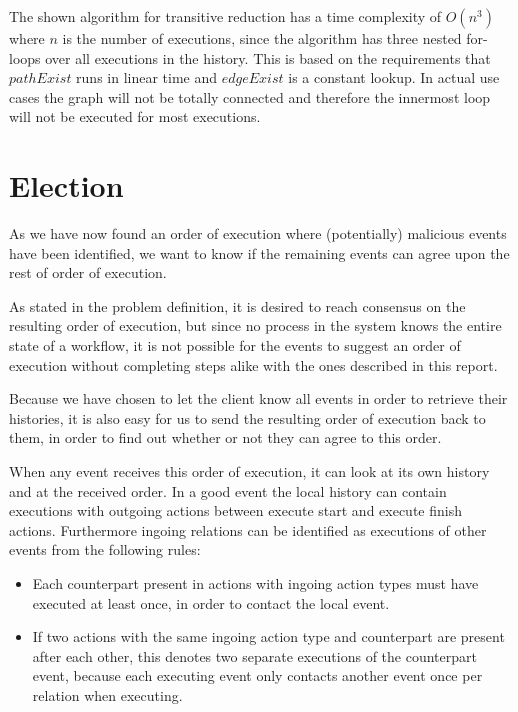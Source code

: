 	\newpar The shown algorithm for transitive reduction has a time complexity of $O(n^3)$ where $n$ is the number of executions, since the algorithm has three nested for-loops over all executions in the history. This is based on the requirements that $pathExist$ runs in linear time and $edgeExist$ is a constant lookup. In actual use cases the graph will not be totally connected and therefore the innermost loop will not be executed for most executions. 



	\section{Election} 
	As we have now found an order of execution where (potentially) malicious events have been identified, we want to know if the remaining events can agree upon the rest of order of execution.
	
	\newpar As stated in the problem definition, it is desired to reach consensus on the resulting order of execution, but since no process in the system knows the entire state of a workflow, it is not possible for the events to suggest an order of execution without completing steps alike with the ones described in this report.
	
	\newpar Because we have chosen to let the client know all events in order to retrieve their histories, it is also easy for us to send the resulting order of execution back to them, in order to find out whether or not they can agree to this order.
	
	\newpar When any event receives this order of execution, it can look at its own history and at the received order. In a good event the local history can contain executions with outgoing actions between execute start and execute finish actions. Furthermore ingoing relations can be identified as executions of other events from the following rules:
	
	\begin{itemize}
		\item Each counterpart present in actions with ingoing action types must have executed at least once, in order to contact the local event.
		\item If two actions with the same ingoing action type and counterpart are present after each other, this denotes two separate executions of the counterpart event, because each executing event only contacts another event once per relation when executing.
	\end{itemize}
	
